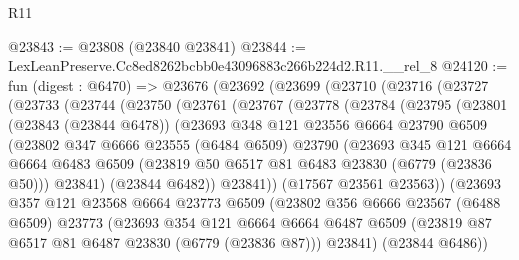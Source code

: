 \begin{lexlean}{R11}
\begin{coremodule}
@23843 := @23808 (@23840 @23841)
@23844 := LexLeanPreserve.Cc8ed8262bcbb0e43096883c266b224d2.R11.__rel_8
@24120 := fun (digest : @6470) =>
  @23676
    (@23692
      (@23699
        (@23710
          (@23716
            (@23727
              (@23733
                (@23744
                  (@23750
                    (@23761
                      (@23767
                        (@23778
                          (@23784
                            (@23795
                              (@23801
                                (@23843 (@23844 @6478))
                                (@23693
                                  @348
                                  @121
                                  @23556
                                  @6664
                                  @23790
                                  @6509
                                  (@23802
                                    @347
                                    @6666
                                    @23555
                                    (@6484 @6509)
                                    @23790
                                    (@23693
                                      @345
                                      @121
                                      @6664
                                      @6664
                                      @6483
                                      @6509
                                      (@23819 @50 @6517 @81 @6483 @23830 (@6779 (@23836 @50)))
                                      @23841)
                                    (@23844 @6482))
                                  @23841))
                              (@17567 @23561 @23563))
                            (@23693
                              @357
                              @121
                              @23568
                              @6664
                              @23773
                              @6509
                              (@23802
                                @356
                                @6666
                                @23567
                                (@6488 @6509)
                                @23773
                                (@23693
                                  @354
                                  @121
                                  @6664
                                  @6664
                                  @6487
                                  @6509
                                  (@23819 @87 @6517 @81 @6487 @23830 (@6779 (@23836 @87)))
                                  @23841)
                                (@23844 @6486))

\end{coremodule}
\end{lexlean}

